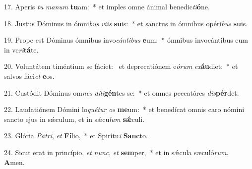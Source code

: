 17. Aperis \textit{tu} \textit{ma}\textit{num} \textbf{tu}am:~*  et imples omne ánimal benedic\textit{ti}\textbf{ó}ne.\

18. Justus Dóminus in ómni\textit{bus} \textit{vi}\textit{is} \textbf{su}is:~*  et sanctus in ómnibus opéri\textit{bus} \textbf{su}is.\

19. Prope est Dóminus ómnibus invo\textit{cán}\textit{ti}\textit{bus} \textbf{e}um:~*  ómnibus invocántibus eum in ve\textit{ri}\textbf{tá}te.\

20. Voluntátem timéntium se fáciet: \dag\  et deprecatiónem e\textit{ó}\textit{rum} \textit{ex}\textbf{áu}diet:~*  et salvos fáci\textit{et} \textbf{e}os.\

21. Custódit Dóminus om\textit{nes} \textit{di}\textit{li}\textbf{gén}tes se:~*  et omnes peccatóres \textit{dis}\textbf{pér}det.\

22. Laudatiónem Dómini lo\textit{qué}\textit{tur} \textit{os} \textbf{me}um:~*  et benedícat omnis caro nómini sancto ejus in sǽculum, et in sǽcu\textit{lum} \textbf{sǽ}culi.\

23. Glória \textit{Pa}\textit{tri}, \textit{et} \textbf{Fí}lio,~*  et Spirítu\textit{i} \textbf{Sanc}to.\

24. Sicut erat in princípio, \textit{et} \textit{nunc}, \textit{et} \textbf{sem}per,~*  et in sǽcula sæculó\textit{rum}. \textbf{A}men.\

